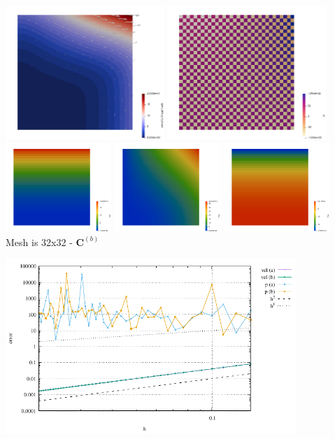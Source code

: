 \begin{center}
\includegraphics[width=6cm]{python_codes/fieldstone_14/results/buha06/vel}
\includegraphics[width=6cm]{python_codes/fieldstone_14/results/buha06/p}\\
\includegraphics[width=4cm]{python_codes/fieldstone_14/results/buha06/exx}
\includegraphics[width=4cm]{python_codes/fieldstone_14/results/buha06/exy}
\includegraphics[width=4cm]{python_codes/fieldstone_14/results/buha06/eyy}\\
{\captionfont Mesh is 32x32 - ${\bm C}^{(b)}$}
\end{center}


\begin{center}
\includegraphics[width=11cm]{python_codes/fieldstone_14/results/buha06/errors.pdf}
\end{center}

